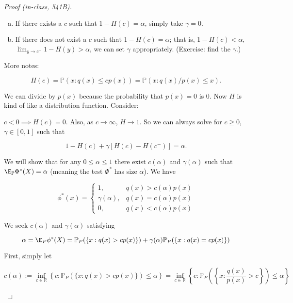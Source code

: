 \begin{proof}[Proof (in-class, 541B)]
\begin{enumerate}
\begin{enumerate}[(a)]
\item If there exists a \(c\) such that \(1 - H(c) = \alpha\), simply take \(\gamma = 0\).

\item If there does not exist a \(c\) such that \(1 - H(c) = \alpha\); that is, \(1 - H(c) < \alpha\), \(\lim_{y \to c^+} 1 - H(y) > \alpha\), we can set \(\gamma\) appropriately. (Exercise: find the \(\gamma\).)

\end{enumerate}

More notes:

\[
H(c) = \mathbb{P}(x: q(x) \leq c p(x) ) = \mathbb{P}(x: q(x)/p(x) \leq x).
\]

We can divide by \(p(x)\) because the probability that \(p(x)= 0\) is 0. Now \(H\) is kind of like a distribution function. Consider:

\(c < 0 \implies H(c) =0 \). Also, as \(c \to \infty\), \(H \to 1\). So we can always solve for \(c \geq 0\), \(\gamma \in [0,1]\) such that 

\[
1 - H(c)  + \gamma[ H(c) - H(c^-) ] = \alpha.
\]

We will show that for any \(0 \leq \alpha \leq 1\) there exist \(c(\alpha)\) and \(\gamma(\alpha)\) such that \(\E_{\mathbb{P}} \Phi^*(X) = \alpha\) (meaning the test \(\Phi^*\) has size \(\alpha\)). We have

\[
\phi^*(x) = \begin{cases}
1, & q(x) > c(\alpha) p(x) \\
\gamma(\alpha), & q(x) = c(\alpha) p(x) \\
0, & q(x) < c(\alpha) p(x)
\end{cases}
\]

We seek \(c(\alpha)\) and \(\gamma(\alpha)\) satisfying

\begin{equation}\label{mathstats.541b.hw2.1.a}
\alpha = \E_P \phi^*(X) = \mathbb{P}_{P}(\{x: q(x) > c p(x) \}) + \gamma(\alpha)  \mathbb{P}_{P}(\{x: q(x) = c p(x)\})
\end{equation}

First, simply let

\begin{equation}\label{mathstats.541b.hw2.1.c}
\boxed{
c(\alpha) := \inf_{c \in \mathbb{R}} \left\{ c:   \mathbb{P}_{P}(\{x: q(x) > c p(x)\}) \leq \alpha \right\}  = \inf_{c \in \mathbb{R}} \left\{  c: \mathbb{P}_{P}\left( \left\{x: \frac{q(x)}{p(x)} > c \right\} \right)  \leq \alpha \right\}
}
\end{equation}


\end{enumerate}
\end{proof}

